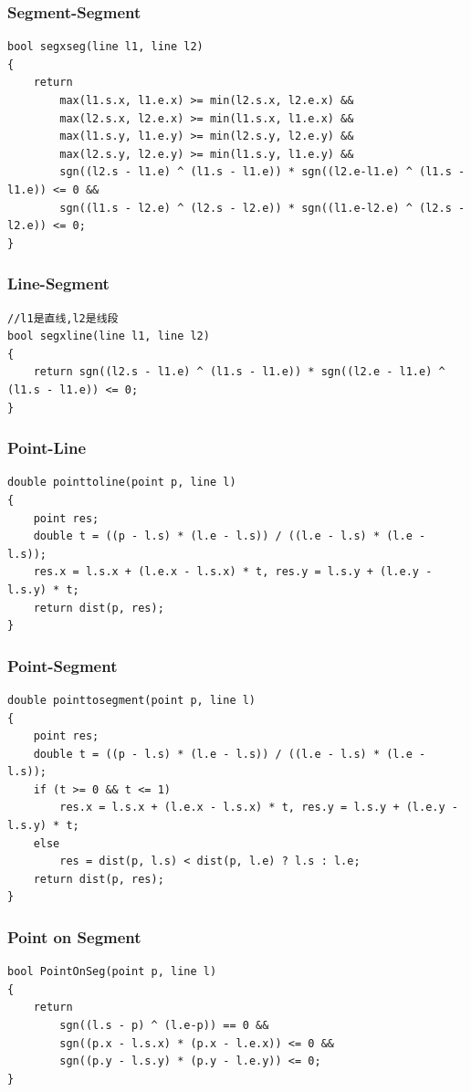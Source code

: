 \documentclass[twoside]{article}
\begin{document}
\subsubsection{Segment-Segment}
\begin{lstlisting}
bool segxseg(line l1, line l2)
{
    return
        max(l1.s.x, l1.e.x) >= min(l2.s.x, l2.e.x) &&
        max(l2.s.x, l2.e.x) >= min(l1.s.x, l1.e.x) &&
        max(l1.s.y, l1.e.y) >= min(l2.s.y, l2.e.y) &&
        max(l2.s.y, l2.e.y) >= min(l1.s.y, l1.e.y) &&
        sgn((l2.s - l1.e) ^ (l1.s - l1.e)) * sgn((l2.e-l1.e) ^ (l1.s - l1.e)) <= 0 &&
        sgn((l1.s - l2.e) ^ (l2.s - l2.e)) * sgn((l1.e-l2.e) ^ (l2.s - l2.e)) <= 0;
}
\end{lstlisting}
\subsubsection{Line-Segment}
\begin{lstlisting}
//l1是直线,l2是线段
bool segxline(line l1, line l2)
{
    return sgn((l2.s - l1.e) ^ (l1.s - l1.e)) * sgn((l2.e - l1.e) ^ (l1.s - l1.e)) <= 0;
}
\end{lstlisting}
\subsubsection{Point-Line}
\begin{lstlisting}
double pointtoline(point p, line l)
{
    point res;
    double t = ((p - l.s) * (l.e - l.s)) / ((l.e - l.s) * (l.e - l.s));
    res.x = l.s.x + (l.e.x - l.s.x) * t, res.y = l.s.y + (l.e.y - l.s.y) * t;
    return dist(p, res);
}
\end{lstlisting}
\subsubsection{Point-Segment}
\begin{lstlisting}
double pointtosegment(point p, line l)
{
    point res;
    double t = ((p - l.s) * (l.e - l.s)) / ((l.e - l.s) * (l.e - l.s));
    if (t >= 0 && t <= 1)
        res.x = l.s.x + (l.e.x - l.s.x) * t, res.y = l.s.y + (l.e.y - l.s.y) * t;
    else
        res = dist(p, l.s) < dist(p, l.e) ? l.s : l.e;
    return dist(p, res);
}
\end{lstlisting}
\subsubsection{Point on Segment}
\begin{lstlisting}
bool PointOnSeg(point p, line l)
{
    return
        sgn((l.s - p) ^ (l.e-p)) == 0 &&
        sgn((p.x - l.s.x) * (p.x - l.e.x)) <= 0 &&
        sgn((p.y - l.s.y) * (p.y - l.e.y)) <= 0;
}
\end{lstlisting}
\end{document}
